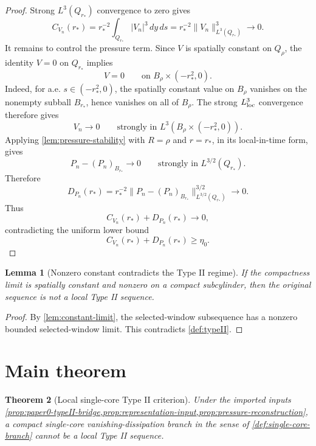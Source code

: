 \documentclass[11pt]{amsart}
\theoremstyle{plain}
\newtheorem{theorem}{Theorem}[section]
\newtheorem{lemma}[theorem]{Lemma}
\theoremstyle{definition}
\theoremstyle{remark}
\begin{document}
\begin{proof}
Strong \(L^3(Q_{r_*})\) convergence to zero gives
\[
  C_{V_n}(r_*)
  =
  r_*^{-2}\int_{Q_{r_*}}|V_n|^3\,dy\,ds
  =
  r_*^{-2}\|V_n\|_{L^3(Q_{r_*})}^3
  \to0.
\]
It remains to control the pressure term.  Since \(V\) is spatially constant on
\(Q_\rho\), the identity \(V=0\) on \(Q_{r_*}\) implies
\[
  V=0
  \qquad\text{on }B_\rho\times(-r_*^2,0).
\]
Indeed, for a.e. \(s\in(-r_*^2,0)\), the spatially constant value on
\(B_\rho\) vanishes on the nonempty subball \(B_{r_*}\), hence vanishes on all
of \(B_\rho\).  The strong \(L^3_{\rm loc}\) convergence therefore gives
\[
  V_n\to0
  \qquad\text{strongly in }L^3(B_\rho\times(-r_*^2,0)).
\]
Applying \cref{lem:pressure-stability} with \(R=\rho\) and \(r=r_*\), in its
local-in-time form, gives
\[
  P_n-(P_n)_{B_{r_*}}\to0
  \qquad\text{strongly in }L^{3/2}(Q_{r_*}).
\]
Therefore
\[
  D_{P_n}(r_*)
  =
  r_*^{-2}
  \|P_n-(P_n)_{B_{r_*}}\|_{L^{3/2}(Q_{r_*})}^{3/2}
  \to0.
\]
Thus
\[
  C_{V_n}(r_*)+D_{P_n}(r_*)\to0,
\]
contradicting the uniform lower bound
\[
  C_{V_n}(r_*)+D_{P_n}(r_*)\ge\eta_0.
\]
\end{proof}

\begin{lemma}[Nonzero constant contradicts the Type II regime]\label{lem:nonzero-contradiction}
If the compactness limit is spatially constant and nonzero on a compact
subcylinder, then the original sequence is not a local Type II sequence.
\end{lemma}

\begin{proof}
By \cref{lem:constant-limit}, the selected-window subsequence has a nonzero
bounded selected-window limit.  This contradicts \cref{def:typeII}.
\end{proof}

\section{Main theorem}

\begin{theorem}[Local single-core Type II criterion]\label{thm:single-core-criterion}
Under the imported inputs
\cref{prop:paper0-typeII-bridge,prop:representation-input,prop:pressure-reconstruction},
a compact single-core vanishing-dissipation branch in the sense of
\cref{def:single-core-branch} cannot be a local Type II sequence.
\end{theorem}
\end{document}
